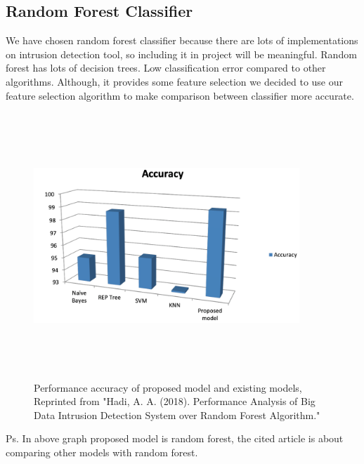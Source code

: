 \documentclass[submission,copyright,creativecommons]{eptcs}
\begin{document}
\subsection{Random Forest Classifier}
We have chosen random forest classifier because there are lots of implementations on intrusion detection tool, so including it in project will be meaningful. Random forest has lots of decision trees. Low classification error compared to other algorithms. Although, it provides some feature selection we decided to use our feature selection algorithm to make comparison between classifier more accurate.
\begin{figure}[H]
\centerline{\includegraphics[height=10cm,width=10cm]{randomvs.png}}
\caption{Performance accuracy of proposed model and existing models, Reprinted from "Hadi, A. A. (2018). Performance Analysis of Big Data Intrusion Detection System over Random Forest Algorithm."\cite{b6}}
\captionsetup{belowskip=0pt}
\end{figure}
Ps. In above graph proposed model is random forest, the cited article is about comparing other models with random forest.
\end{document}
